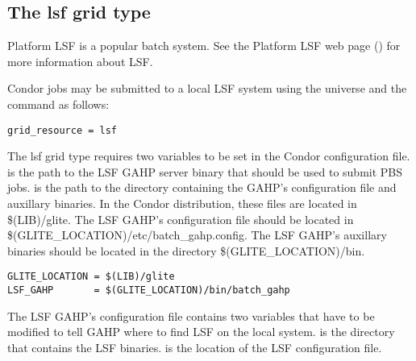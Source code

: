 
\subsection{\label{sec:LSF}The lsf grid type }

Platform LSF is a popular batch system. See the Platform LSF web page
()
for more information about LSF.

Condor jobs may be submitted to a local LSF system
using the  universe and the
 command as follows:
\begin{verbatim}
grid_resource = lsf
\end{verbatim}

The lsf grid type requires two variables to be set in the Condor
configuration file.
 is the path to the LSF GAHP server binary that should be
used to submit PBS jobs.
 is the path to the directory containing the GAHP's
configuration file and auxillary binaries.
In the Condor distribution, these files are located in \$(LIB)/glite.
The LSF GAHP's configuration file should be located in
\$(GLITE\_LOCATION)/etc/batch\_gahp.config. The LSF GAHP's auxillary binaries
should be located in the directory \$(GLITE\_LOCATION)/bin.

\begin{verbatim}
GLITE_LOCATION = $(LIB)/glite
LSF_GAHP       = $(GLITE_LOCATION)/bin/batch_gahp
\end{verbatim}

The LSF GAHP's configuration file contains two variables that have to be
modified to tell GAHP where to find LSF on the local system.
 is the directory that contains the LSF binaries.
 is the location of the LSF configuration file.

